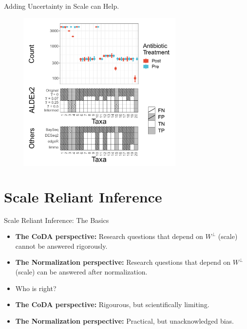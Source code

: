 \documentclass[
  ignorenonframetext,
]{beamer}
\begin{document}
\begin{frame}{Adding Uncertainty in Scale can Help.}
\protect\hypertarget{adding-uncertainty-in-scale-can-help.}{}
\begin{figure}
  \centering
  \includegraphics[width=3.25in]{figures/sim-res.pdf}
\end{figure}
\end{frame}

\hypertarget{scale-reliant-inference}{%
\section{Scale Reliant Inference}\label{scale-reliant-inference}}

\begin{frame}{Scale Reliant Inference: The Basics}
\protect\hypertarget{scale-reliant-inference-the-basics}{}
\begin{itemize}
\item
  \textbf{The CoDA perspective:} Research questions that depend on
  \(W^\perp\) (scale) cannot be answered rigorously.
\item
  \textbf{The Normalization perspective:} Research questions that depend
  on \(W^\perp\) (scale) can be answered after normalization.
\item
  Who is right?
\end{itemize}

\pause

\begin{itemize}
\item
  \textbf{The CoDA perspective:} Rigourous, but scientifically limiting.
\item
  \textbf{The Normalization perspective:} Practical, but unacknowledged
  bias.
\end{itemize}
\end{frame}
\end{document}
